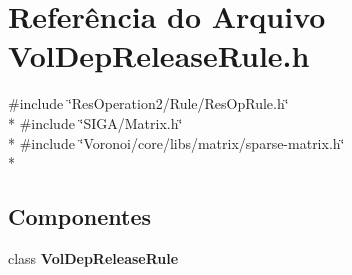 \section{Referência do Arquivo Vol\+Dep\+Release\+Rule.\+h}
\label{_2_rule_2_vol_dep_release_2_vol_dep_release_rule_8h}
{\ttfamily \#include \char`\"{}Res\+Operation2/\+Rule/\+Res\+Op\+Rule.\+h\char`\"{}}\\*
{\ttfamily \#include \char`\"{}S\+I\+G\+A/\+Matrix.\+h\char`\"{}}\\*
{\ttfamily \#include \char`\"{}Voronoi/core/libs/matrix/sparse-\/matrix.\+h\char`\"{}}\\*
\subsection*{Componentes}
\begin{DoxyCompactItemize}
\item 
class {\bf Vol\+Dep\+Release\+Rule}
\end{DoxyCompactItemize}
